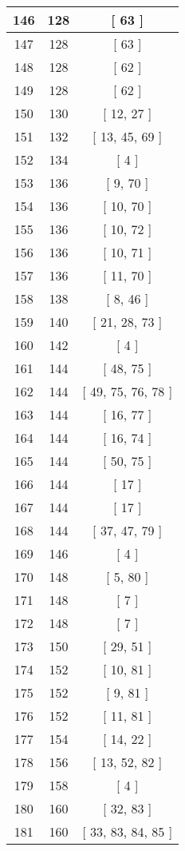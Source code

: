 \begin{center}
\begin{longtable}[H]{|| c c c ||}
\hline
146 & 128 & [ 63 ] \\ 
\hline
147 & 128 & [ 63 ] \\ 
\hline
148 & 128 & [ 62 ] \\ 
\hline
149 & 128 & [ 62 ] \\ 
\hline
150 & 130 & [ 12, 27 ] \\ 
\hline
151 & 132 & [ 13, 45, 69 ] \\ 
\hline
152 & 134 & [ 4 ] \\ 
\hline
153 & 136 & [ 9, 70 ] \\ 
\hline
154 & 136 & [ 10, 70 ] \\ 
\hline
155 & 136 & [ 10, 72 ] \\ 
\hline
156 & 136 & [ 10, 71 ] \\ 
\hline
157 & 136 & [ 11, 70 ] \\ 
\hline
158 & 138 & [ 8, 46 ] \\ 
\hline
159 & 140 & [ 21, 28, 73 ] \\ 
\hline
160 & 142 & [ 4 ] \\ 
\hline
161 & 144 & [ 48, 75 ] \\ 
\hline
162 & 144 & [ 49, 75, 76, 78 ] \\ 
\hline
163 & 144 & [ 16, 77 ] \\ 
\hline
164 & 144 & [ 16, 74 ] \\ 
\hline
165 & 144 & [ 50, 75 ] \\ 
\hline
166 & 144 & [ 17 ] \\ 
\hline
167 & 144 & [ 17 ] \\ 
\hline
168 & 144 & [ 37, 47, 79 ] \\ 
\hline
169 & 146 & [ 4 ] \\ 
\hline
170 & 148 & [ 5, 80 ] \\ 
\hline
171 & 148 & [ 7 ] \\ 
\hline
172 & 148 & [ 7 ] \\ 
\hline
173 & 150 & [ 29, 51 ] \\ 
\hline
174 & 152 & [ 10, 81 ] \\ 
\hline
175 & 152 & [ 9, 81 ] \\ 
\hline
176 & 152 & [ 11, 81 ] \\ 
\hline
177 & 154 & [ 14, 22 ] \\ 
\hline
178 & 156 & [ 13, 52, 82 ] \\ 
\hline
179 & 158 & [ 4 ] \\ 
\hline
180 & 160 & [ 32, 83 ] \\ 
\hline
181 & 160 & [ 33, 83, 84, 85 ] \\ 

\end{longtable}
\end{center}
